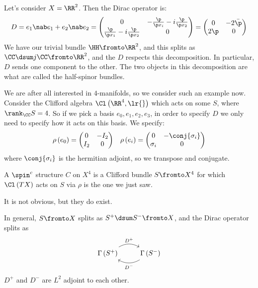 \documentclass{amsart}
\begin{document}
\begin{exm}
Let's consider $X = \RR^2$. 
Then the Dirac operator is:
\begin{equation}
D = e_1 \nab e_1 + e_2 \nab e_2 = 
\begin{pmatrix}
0 &
-\frac{\p}{\p x_i}  - i \frac{\p }{\p x_2}
\\
\frac{\p}{\p x_1} - i \frac{\p}{\p x_2}
&0
\end{pmatrix}
= 
\begin{pmatrix}
0 & -2\bar \p \\
2\p & 0
\end{pmatrix}
\end{equation}
We have our trivial bundle $\HH \fromto \RR^2$, and this splits as $\CC \dsum j \CC \fromto \RR^2$, 
and the $D$ respects this decomposition. 
In particular, $D$ sends one component to the other.
The two objects in this decomposition are what are called the half-spinor bundles.
\end{exm}

\begin{exm}
We are after all interested in $4$-manifolds, so we consider such an example now. 
Consider the Clifford algebra $\Cl\left( \RR^4 , \lr{} \right)$ which acts on some $S$, where 
$\rank_\CC S = 4$. So if we pick a basis $e_0 , e_1 , e_2 , e_3$, in order to specify $D$ we
only need to specify how it acts on this basis. 
We specify:
\begin{align}
\rho\left( e_0 \right) = 
\begin{pmatrix}
0 & -I_2 \\ I_2 & 0
\end{pmatrix}
&&
\rho\left( e_i \right) = 
\begin{pmatrix}
0 & -\conj{\sigma_i} \\ \sigma_i & 0
\end{pmatrix}
\end{align}
where $\conj{\sigma_i}$ is the hermitian adjoint, so we transpose and conjugate.
\end{exm}

\begin{defn}
A $\spin^c$ structure $C$ on $X^4$ is a Clifford bundle $S\fromto X^4$
for which $\Cl\left( TX \right)$ acts on $S$ via $\rho$ is the one we just saw.
\end{defn}

It is not obvious, but they do exist.

In general, $S\fromto X$ splits as $S^+ \dsum S^-\fromto X$, and the Dirac operator
splits as
\begin{equation}
\begin{tikzcd}
\Gamma\left( S^+ \right) \arrow[bend left]{r}{D^+}&
\Gamma\left( S^- \right)\arrow[bend left]{l}{D^-}
\end{tikzcd}
\end{equation}
$D^+$ and $D^-$ are $L^2$ adjoint to each other.
\end{document}
